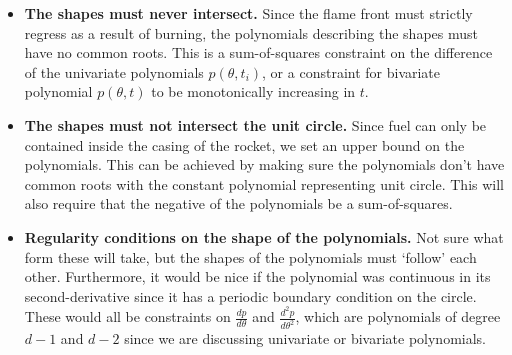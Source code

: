 \begin{itemize}
        \item \textbf{The shapes must never intersect.} Since the flame front must strictly regress as a result of burning, the polynomials describing the shapes must have no common roots. This is a sum-of-squares constraint on the difference of the univariate polynomials $p(\theta, t_i)$, or a constraint for bivariate polynomial $p(\theta, t)$ to be monotonically increasing in $t$.
        \item\textbf{The shapes must not intersect the unit circle.} Since fuel can only be contained inside the casing of the rocket, we set an upper bound on the polynomials. This can be achieved by making sure the polynomials don't have common roots with the constant polynomial representing unit circle. This will also require that the negative of the polynomials be a sum-of-squares.
        \item \textbf{Regularity conditions on the shape of the polynomials.} Not sure what form these will take, but the shapes of the polynomials must `follow' each other. Furthermore, it would be nice if the polynomial was continuous in its second-derivative since it has a periodic boundary condition on the circle. These would all be constraints on $\frac{dp}{d\theta}$ and $\frac{d^2p}{d\theta^2}$, which are polynomials of degree $d-1$ and $d-2$ since we are discussing univariate or bivariate polynomials.
    \end{itemize}
